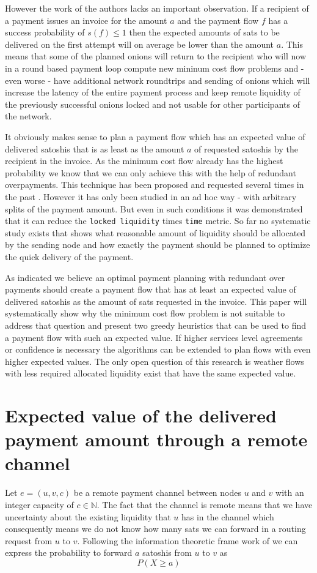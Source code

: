 \documentclass[10pt,twocolumn]{article}
\begin{document}
However the work of the authors lacks an important observation. If a recipient of a payment issues an invoice for the amount $a$ and the payment flow $f$ has a success probability of $s(f)\leq 1$ then the expected amounts of sats to be delivered on the first attempt will on average be lower than the amount $a$.
This means that some of the planned onions will return to the recipient who will now in a round based payment loop compute new mininum cost flow problems and - even worse - have additional network roundtrips and sending of onions which will increase the latency of the entire payment process and keep remote liquidity of the previously successful onions locked and not usable for other participants of the network.

It obviously makes sense to plan a payment flow which has an expected value of delivered satoshis that is as least as the amount $a$ of requested satoshis by the recipient in the invoice.
As the minimum cost flow already has the highest probability we know that we can only achieve this with the help of redundant overpayments.
This technique has been proposed and requested several times in the past \cite{bagaria2020boomerang,rahimpour2021spear,corallo2023,riard2023}.
However it has only been studied in an ad hoc way - with arbitrary splits of the payment amount. But even in such conditions it was demonstrated that it can reduce the \texttt{locked liquidity} times \texttt{time} metric. 
So far no systematic study exists that shows what reasonable amount of liquidity should be allocated by the sending node and how exactly the payment should be planned to optimize the quick delivery of the payment.

As indicated we believe an optimal payment planning with redundant over payments should create a payment flow that has at least an expected value of delivered satoshis as the amount of sats requested in the invoice.
This paper will systematically show why the minimum cost flow problem is not suitable to address that question and present two greedy heuristics that can be used to find a payment flow with such an expected value.
If higher services level agreements or confidence is necessary the algorithms can be extended to plan flows with even higher expected values.
The only open question of this research is weather flows with less required allocated liquidity exist that have the same expected value.

\section{Expected value of the delivered payment amount through a remote channel}
Let $e=(u,v,c)$ be a remote payment channel between nodes $u$ and $v$ with an integer capacity of $c \in\mathbb{N}$.
The fact that the channel is remote means that we have uncertainty about the existing liquidity that $u$ has in the channel which consequently means we do not know how many sats we can forward in a routing request from $u$ to $v$.
Following the information theoretic frame work of \cite{pickhardt2021security} we can express the probability to forward $a$ satoshis from $u$ to $v$ as
\[
P(X\geq a)
\]
\end{document}

